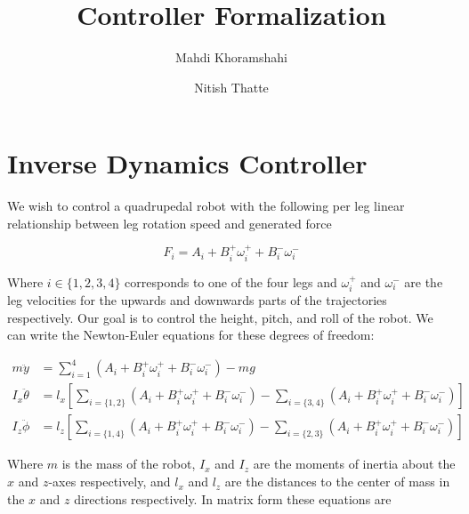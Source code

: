 \documentclass{article}
\begin{document}
\title{Controller Formalization}
\author{Mahdi Khoramshahi \and Nitish Thatte}
\maketitle

\section*{Inverse Dynamics Controller}

We wish to control a quadrupedal robot with the following per leg linear relationship between leg rotation speed and generated force

\begin{equation}
	F_i = A_i + B_i^+ \omega_i^+ + B_i^- \omega_i^-
\end{equation}

Where $i \in \{1,2,3,4\}$ corresponds to one of the four legs and $\omega_i^+$ and $\omega_i^-$ are the leg velocities for the upwards and downwards parts of the trajectories respectively. Our goal is to control the height, pitch, and roll of the robot. We can write the Newton-Euler equations for these degrees of freedom:

\begin{align}
	m \ddot{y} &= \sum_{i=1}^4 (A_i + B_i^+ \omega_i^+ + B_i^- \omega_i^-) - mg \\
	I_x \ddot{\theta} &= l_x \left[ \sum_{i = \{1,2\}} \left(A_i + B_i^+ \omega_i^+ + B_i^- \omega_i^- \right) - \sum_{i = \{3,4\}} \left(A_i + B_i^+ \omega_i^+ + B_i^- \omega_i^- \right) \right] \\
	I_z \ddot{\phi} &= l_z \left[ \sum_{i = \{1,4\}} \left(A_i + B_i^+ \omega_i^+ + B_i^- \omega_i^- \right) - \sum_{i = \{2,3\}} \left(A_i + B_i^+ \omega_i^+ + B_i^- \omega_i^- \right) \right]
\end{align}

Where $m$ is the mass of the robot, $I_x$ and $I_z$ are the moments of inertia about the $x$ and $z$-axes respectively, and $l_x$ and $l_z$ are the distances to the center of mass in the $x$ and $z$ directions respectively. In matrix form these equations are 
\end{document}
